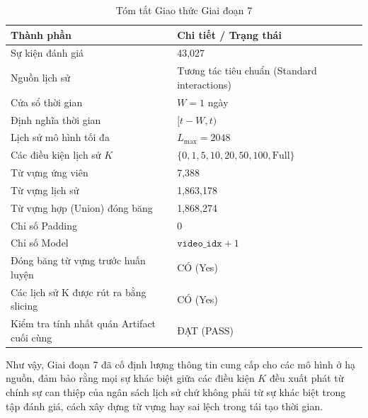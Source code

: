 \documentclass[12pt,a4paper]{article}
\begin{document}
\begin{table}[h]
\centering
\caption{Tóm tắt Giao thức Giai đoạn 7}
\label{tab:phase7-summary}
\begin{tabular}{ll}
\toprule
\textbf{Thành phần} & \textbf{Chi tiết / Trạng thái} \\
\midrule
Sự kiện đánh giá & 43,027 \\
Nguồn lịch sử & Tương tác tiêu chuẩn (Standard interactions) \\
Cửa sổ thời gian & $W = 1$ ngày \\
Định nghĩa thời gian & $[t-W, t)$ \\
Lịch sử mô hình tối đa & $L_{\max} = 2048$ \\
Các điều kiện lịch sử $K$ & $\{0, 1, 5, 10, 20, 50, 100, \mathrm{Full}\}$ \\
Từ vựng ứng viên & 7,388 \\
Từ vựng lịch sử & 1,863,178 \\
Từ vựng hợp (Union) đóng băng & 1,868,274 \\
Chỉ số Padding & 0 \\
Chỉ số Model & $\texttt{video\_idx} + 1$ \\
Đóng băng từ vựng trước huấn luyện & CÓ (Yes) \\
Các lịch sử K được rút ra bằng slicing & CÓ (Yes) \\
Kiểm tra tính nhất quán Artifact cuối cùng & ĐẠT (PASS) \\
\bottomrule
\end{tabular}
\end{table}

\noindent Như vậy, Giai đoạn 7 đã cố định lượng thông tin cung cấp cho các mô hình ở hạ nguồn, đảm bảo rằng mọi sự khác biệt giữa các điều kiện $K$ đều xuất phát từ chính sự can thiệp của ngân sách lịch sử chứ không phải từ sự khác biệt trong tập đánh giá, cách xây dựng từ vựng hay sai lệch trong tái tạo thời gian.
\end{document}
